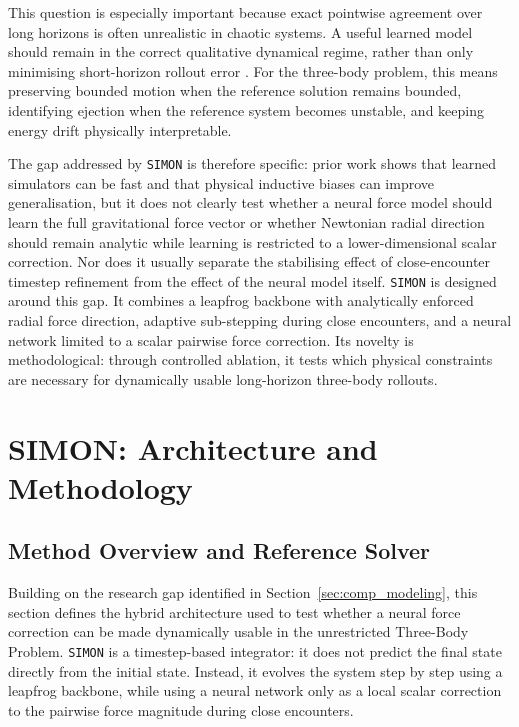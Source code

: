 \documentclass[12pt]{article}
\begin{document}
This question is especially important because exact pointwise agreement over long
horizons is often unrealistic in chaotic systems. A useful learned model should remain
in the correct qualitative dynamical regime, rather than only minimising short-horizon
rollout error \cite{linot2022stabilized,margazoglou2023stability}. For the three-body
problem, this means preserving bounded motion when the reference solution remains
bounded, identifying ejection when the reference system becomes unstable, and keeping
energy drift physically interpretable.

The gap addressed by \texttt{SIMON} is therefore specific: prior work shows that learned
simulators can be fast and that physical inductive biases can improve generalisation, but
it does not clearly test whether a neural force model should learn the full gravitational
force vector or whether Newtonian radial direction should remain analytic while learning
is restricted to a lower-dimensional scalar correction. Nor does it usually separate the
stabilising effect of close-encounter timestep refinement from the effect of the neural
model itself. \texttt{SIMON} is designed around this gap. It combines a leapfrog backbone
with analytically enforced radial force direction, adaptive sub-stepping during close
encounters, and a neural network limited to a scalar pairwise force correction. Its
novelty is methodological: through controlled ablation, it tests which physical
constraints are necessary for dynamically usable long-horizon three-body rollouts.

\section{SIMON: Architecture and Methodology}
\label{sec:methodology}

\subsection{Method Overview and Reference Solver}
\label{research_obj}

Building on the research gap identified in Section~\ref{sec:comp_modeling}, this section
defines the hybrid architecture used to test whether a neural force correction can be made
dynamically usable in the unrestricted Three-Body Problem. \texttt{SIMON} is a timestep-based
integrator: it does not predict the final state directly from the initial state. Instead, it
evolves the system step by step using a leapfrog backbone, while using a neural network only
as a local scalar correction to the pairwise force magnitude during close encounters.
\end{document}
